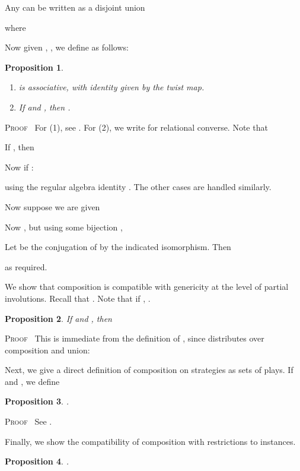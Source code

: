\documentclass[a4paper,11pt]{article}
\newtheorem{proposition}{Proposition}[section]
\newenvironment{proof}{\textsc{Proof}\ }{}
\begin{document}
Any  can be written as a disjoint union

where

Now given , , we define  as follows:


\begin{proposition}
\label{invcomp}
\begin{enumerate}
\item  is associative, with identity given by the twist map.
\item If  and , then .
\end{enumerate}
\end{proposition}
\begin{proof}
For (1), see \cite{AJ94a}. For (2), we write  for relational
converse. Note that

If , then

Now if :

using the regular algebra identity .
The other cases are handled similarly.
\end{proof}

\noindent Now suppose we are given


Now , but using some bijection ,

Let  be the conjugation of  by the
indicated isomorphism. Then

as required.

We show that composition is compatible with genericity at the level of
partial involutions. Recall that . Note that if , .
\begin{proposition}
If  and , then

\end{proposition}
\begin{proof}
This is immediate from the definition of , since  distributes over composition and union:

\end{proof}

Next, we give a direct definition of composition on strategies as sets
of plays.
If  and , we
define


\begin{proposition}
.
\end{proposition}
\begin{proof}
See \cite{AJ94a}.
\end{proof}

\noindent Finally, we show the compatibility of composition with
restrictions to instances.
\begin{proposition}
.
\end{proposition}
\end{document}
